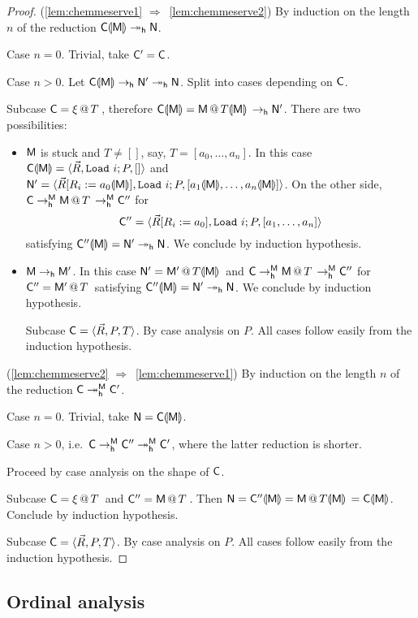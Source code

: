 \begin{proof} (\ref{lem:chemmeserve1} $\Rightarrow$~\ref{lem:chemmeserve2})
By induction on the length $n$ of the reduction $\C\hole{\mM}\reddh\mN$.

Case $n = 0$. Trivial, take $\C'=\C$.

Case $n > 0$. Let $\C\hole{\mM}\redh\mN'\reddh\mN$. Split into cases depending on $\C$.

Subcase $\C = \appT{\xi}{T}$, therefore $\C\hole{\mM} = \appT{\mM}{T\hole{\mM}}\redh\mN'$. There are two possibilities:
\begin{itemize}
\item $\mM$ is stuck and $T\neq[]$, say, $T=[a_0,\dots,a_n]$. In this case $\C\hole{\mM} = \tuple{\vec R,\Load i;P,[]}$ and $\mN' = \tuple{\vec R\repl{R_i}{a_0\hole{\mM}},\Load i;P,[a_1\hole{\mM},\dots,a_n\hole{\mM}]}$.
On the other side, $\C\ured \appT{\mM}{T}\ured \C''$ for
\[
	\C'' = \tuple{\vec R\repl{R_i}{a_0},\Load i;P,[a_1,\dots,a_n]}
\]
satisfying $\C''\hole{\mM} = \mN'\reddh\mN$. We conclude by induction hypothesis.
\item $\mM\redh\mM'$. In this case $\mN' = \appT{\mM'}{T\hole{\mM}}$ and $\C\ured \appT{\mM}{T}\ured \C''$ for $\C'' = \appT{\mM'}{T}$ satisfying $\C''\hole{\mM} = \mN'\reddh\mN$. We conclude by induction hypothesis.

Subcase $\C = \tuple{\vec R,P,T}$. By case analysis on $P$. All cases follow easily from the induction hypothesis.
\end{itemize}

(\ref{lem:chemmeserve2} $\Rightarrow$~\ref{lem:chemmeserve1})
By induction on the length $n$ of the reduction $\C\reddh^\mM\C'$.

Case $n=0$. Trivial, take $\mN=\C\hole{\mM}$.

Case $n>0$, i.e.\ $\C\ured\C''\uredd\C'$, where the latter reduction is shorter.

Proceed by case analysis on the shape of $\C$.

Subcase $\C = \appT{\xi}{T}$ and $\C''=\appT{\mM}{T}$.
Then $\mN = \C''\hole{\mM} = \appT{\mM}{T\hole{\mM}} = \C\hole{\mM}$.
Conclude by induction hypothesis.

Subcase $\C = \tuple{\vec R,P,T}$. By case analysis on $P$. All cases follow easily from the induction hypothesis.
\end{proof}

\subsection{Ordinal analysis}

